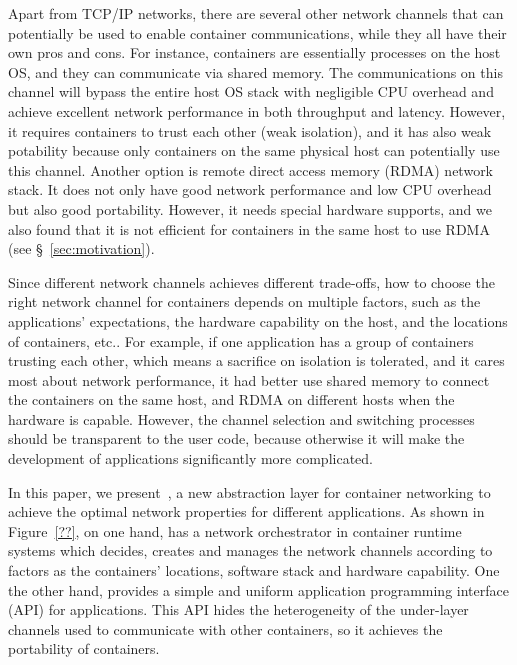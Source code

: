 Apart from TCP/IP networks, there are several other network channels that can potentially be used to enable 
container communications, while they all have their own pros and cons.
For instance, containers are essentially processes on the host OS, and they can communicate
via shared memory. The communications on this channel will bypass the entire host OS stack with negligible CPU overhead and achieve
excellent network performance in both throughput and latency. However, it requires containers to trust each other (weak isolation), 
and it has also weak
potability because only containers on the same physical host can potentially use this channel. Another option is remote direct access memory (RDMA) network stack. It does not only have good network performance and low CPU overhead but also good portability. 
However, it needs special hardware supports, and we also found that it is not efficient for containers in the same host to use RDMA
(see \S~\ref{sec:motivation}). 

Since different network channels achieves different trade-offs, how to choose the right network channel for containers depends 
on multiple factors, such as the applications' expectations, 
the hardware capability on the host, and the locations of containers, etc.. For example, if one application has a group of containers trusting each other, which means a sacrifice on isolation is tolerated, and it cares most about network performance, it had better use
shared memory to connect the containers on the same host, and RDMA on different hosts when the hardware is capable. However, the channel selection and switching processes should be transparent to the user code, because otherwise it will make the development of applications significantly more complicated.

In this paper, we present~\sysname, a new abstraction layer for container networking to achieve the optimal network properties for different applications. 
As shown in Figure~\ref{??}, on one hand, \sysname has a network orchestrator in container runtime systems which decides, creates and manages the network channels according to factors as the containers' locations, software stack and hardware capability. One the other hand, \sysname provides a simple and uniform application programming interface (API) for applications. This API hides the heterogeneity of the under-layer channels used
to communicate with other containers, so it achieves the portability of containers.   

